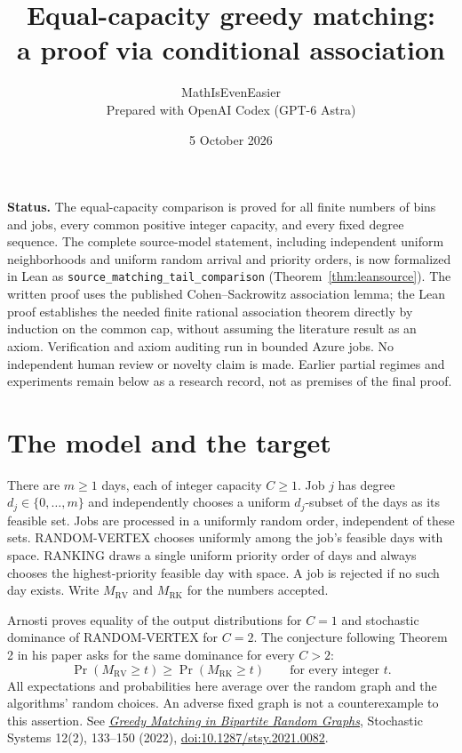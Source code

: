 \documentclass[11pt]{article}
\title{Equal-capacity greedy matching:\\a proof via conditional association}
\author{MathIsEvenEasier\\\small Prepared with OpenAI Codex (GPT-6 Astra)}
\date{5 October 2026}
\newcommand{\RV}{\mathrm{RV}}
\newcommand{\RK}{\mathrm{RK}}
\begin{document}
\maketitle

\noindent\textbf{Status.} The equal-capacity comparison is proved for
all finite numbers of bins and jobs, every common positive integer capacity,
and every fixed degree sequence. The complete source-model statement,
including independent uniform neighborhoods and uniform random arrival
and priority orders, is now formalized in Lean as
\texttt{source\_matching\_tail\_comparison}
(Theorem~\ref{thm:leansource}). The written proof uses the published
Cohen--Sackrowitz association lemma; the Lean proof establishes the needed
finite rational association theorem directly by induction on the common
cap, without assuming the literature result as an axiom. Verification and
axiom auditing run in bounded Azure jobs. No independent human review or
novelty claim is made. Earlier partial regimes and experiments remain below
as a research record, not as premises of the final proof.

\section{The model and the target}
There are $m\geq 1$ days, each of integer capacity $C\geq 1$.
Job $j$ has degree $d_j\in\{0,\ldots,m\}$ and independently chooses a
uniform $d_j$-subset of the days as its feasible set. Jobs are processed in
a uniformly random order, independent of these sets.
RANDOM-VERTEX chooses uniformly among the job's feasible days with space.
RANKING draws a single uniform priority order of days and always chooses
the highest-priority feasible day with space. A job is rejected if no
such day exists. Write $M_\RV$ and $M_\RK$ for the numbers accepted.

Arnosti proves equality of the output distributions for $C=1$ and
stochastic dominance of RANDOM-VERTEX for $C=2$. The conjecture following
Theorem 2 in his paper asks for the same dominance for every $C>2$:
\[
 \Pr(M_\RV\geq t)\geq\Pr(M_\RK\geq t)\qquad\text{for every integer }t.
\]
All expectations and probabilities here average over the random graph
and the algorithms' random choices. An adverse fixed graph is not a
counterexample to this assertion. See
\href{https://nickarnosti.com/ResearchPapers/Arnosti_GreedyMatching.pdf}{\emph{Greedy Matching in Bipartite Random Graphs}},
Stochastic Systems 12(2), 133--150 (2022),
\href{https://doi.org/10.1287/stsy.2021.0082}{doi:10.1287/stsy.2021.0082}.
\end{document}
